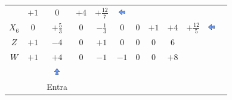 \documentclass{beamer}
\begin{document}
\begin{frame}
{\begin{table}
\begin{tabular}{c c c c c c c c c c c c}
				& \cellcolor{yellow!50} $\scriptstyle +1$
				& \cellcolor{yellow!50} $\scriptstyle 0$ 
				& \cellcolor{gray!50} $\scriptstyle +4$ 
				& $ \scriptstyle +\frac{12}{7} $ & \includegraphics[width=0.3cm,height=0.3cm]{setaesquerda.jpg}\\
				\cellcolor{blue!100} \color{red} $\scriptstyle X_6$
				& \cellcolor{yellow!50} $\scriptstyle 0$
				& \cellcolor{gray!50} $\scriptstyle +\frac{5}{3}$
				& \cellcolor{yellow!50} $\scriptstyle 0$
				& \cellcolor{yellow!50} $\scriptstyle -\frac{1}{3}$
				& \cellcolor{yellow!50} $\scriptstyle 0$
				& \cellcolor{yellow!50} $\scriptstyle 0$
				& \cellcolor{yellow!50} $\scriptstyle +1$
				& \cellcolor{gray!50} $\scriptstyle +4$ 
				& $ \scriptstyle +\frac{12}{5} $ & \includegraphics[width=0.3cm,height=0.3cm]{setaesquerda.jpg}\\
				\cellcolor{blue!100} \color{white} $\scriptstyle Z$
				& \cellcolor{yellow!50} $\scriptstyle +1$
				& \cellcolor{gray!50} $\scriptstyle -4$
				& \cellcolor{yellow!50} $\scriptstyle 0$
				& \cellcolor{yellow!50} $\scriptstyle +1$
				& \cellcolor{yellow!50} $\scriptstyle 0$
				& \cellcolor{yellow!50} $\scriptstyle 0$
				& \cellcolor{yellow!50} $\scriptstyle 0$ 
				& \cellcolor{gray!50} $\scriptstyle 6$  \\
				\cellcolor{blue!100} \color{white} $\scriptstyle W$
				& \cellcolor{yellow!90} $\scriptstyle +1$
				& \cellcolor{gray!50} $\scriptstyle +4$
				& \cellcolor{yellow!90} $\scriptstyle 0$
				& \cellcolor{yellow!90} $\scriptstyle -1$
				& \cellcolor{yellow!90} $\scriptstyle -1$
				& \cellcolor{yellow!90} $\scriptstyle 0$
				& \cellcolor{yellow!90} $\scriptstyle 0$ 
				& \cellcolor{gray!50} $\scriptstyle +8$  \\
				& & \includegraphics[width=0.3cm,height=0.3cm]{setacima.jpg} \\
				& & \scriptsize Entra \\
			\end{tabular}
		\end{table}			
	}
	{
		\begin{table}		
			\begin{tabular}{c c c c c c c c c c c c}
				\cline{1-8} 

\end{tabular}
\end{table}}
\end{frame}
\end{document}
